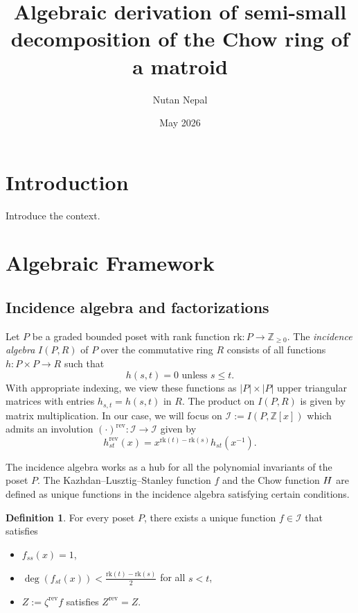 \documentclass{article}
\title{Algebraic derivation of semi-small decomposition of
the Chow ring of a matroid}
\author{Nutan Nepal}
\date{May 2026}
\newcommand{\rev}{\mathrm{rev}}
\newcommand{\rk}{\text{rk}}
\newcommand{\chow}{\normalfont{H}}
\theoremstyle{definition}
\newtheorem{definition}[theorem]{Definition}
\theoremstyle{remark}
\begin{document}
\maketitle

\section{Introduction}
Introduce the context.

\section{Algebraic Framework}

\subsection{Incidence algebra and factorizations}

Let \(P\) be a graded bounded poset with rank function \(\rk: P \to \mathbb{Z}_{\ge 0}\).
The \emph{incidence algebra} \(I(P, R)\) of \(P\) over the commutative ring \(R\)
consists of all functions \(h: P \times P \to R\) such that
\[
h(s, t) = 0 \text{ unless } s \leq t.
\]
With appropriate indexing, we view these functions as \(|P|\times |P|\)
upper triangular matrices with entries \(h_{s,t} = h(s, t)\) in \(R\).
The product on \(I(P, R)\) is given by matrix multiplication. In our case, we will
focus on \(\mathcal{I}:=I(P, \mathbb{Z}[x])\)
which admits an involution \((\cdot)^{\rev}: \mathcal{I} \to \mathcal{I}\) given by
\[
  h^\rev_{st}(x) = x^{\rk(t)-\rk(s)}h_{st}(x^{-1}).
\]

The incidence algebra works as a hub for all
the polynomial invariants of the poset \(P\).
The Kazhdan--Lusztig--Stanley function \(f\) and
the Chow function \(\chow\) are defined as
unique functions in the incidence algebra satisfying
certain conditions.

\begin{definition}
    For every poset \(P\), there exists a unique function
    \(f\in \mathcal{I}\) that satisfies
    \begin{itemize}
        \item \(f_{ss}(x) = 1\),
        \item \(\deg(f_{st}(x))<\frac{\rk(t)-\rk(s)}{2}\) for all \(s < t\),
        \item \(Z:= \zeta^{\rev} f\) satisfies
            \(Z^{\rev} = Z\).
    \end{itemize}
\end{definition}
\end{document}
